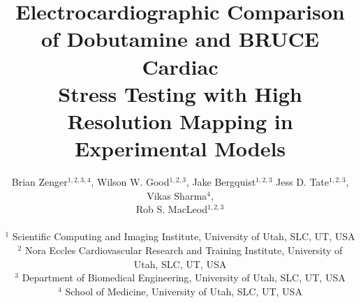 \documentclass[twocolumn]{cinc}
\begin{document}
\title{Electrocardiographic Comparison of Dobutamine and BRUCE Cardiac \\ Stress Testing with High Resolution Mapping in Experimental Models}


\author { Brian Zenger$^{1,2,3,4}$, Wilson W. Good$^{1,2,3}$, Jake Bergquist$^{1,2,3}$ Jess D. Tate$^{1,2,3}$, Vikas Sharma$^{4}$, \\Rob S. MacLeod$^{1,2,3}$\\
\ \\ %
$^1$ Scientific Computing and Imaging Institute, University of Utah, SLC, UT, USA \\
$^2$  Nora Eccles Cardiovascular Research and Training Institute, University of Utah, SLC, UT, USA \\
$^3$ Department of Biomedical Engineering, University of Utah, SLC, UT, USA \\
$^4$ School of Medicine, University of Utah, SLC, UT, USA }

\maketitle
\end{document}
